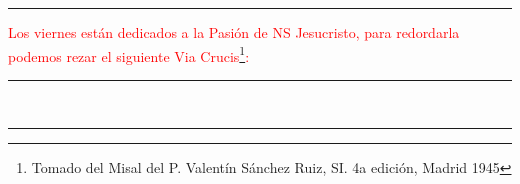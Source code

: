 \documentclass[10pt,twoside]{book}
\begin{document}
\noindent{}


\vspace{0.5em}



\vspace{0.5em}

\noindent{}


\vspace{0.5em}



\vspace{0.5em}

\noindent{}


\vspace{0.5em}

{}

\iralfinal

\begin{center}
      {\rule{10em}{0.4pt}}

      \vspace{0.75em}

      \textcolor{red}{Los viernes están dedicados a la Pasión de NS Jesucristo, para redordarla podemos rezar el siguiente Via Crucis\footnote{Tomado del Misal del P. Valentín Sánchez Ruiz, SI. 4a edición, Madrid 1945}:}
\end{center}

\begin{multicols}{2}

      

\end{multicols}

\begin{center}
      \begin{spacing}{0.25}
            {\rule{20em}{0.4pt}}\\
            {\rule{20em}{0.4pt}}
      \end{spacing}
\end{center}


\end{document}
